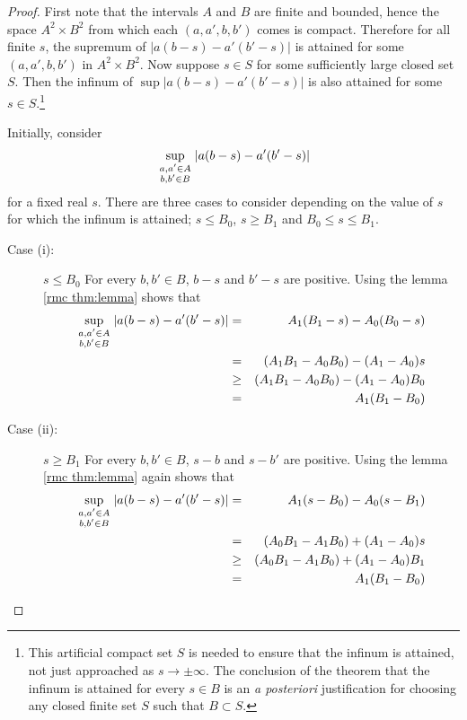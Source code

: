 \begin{proof}
First note that the intervals $A$ and $B$ are finite and bounded, hence the
space $A^2\times B^2$ from which each $(a,a',b,b')$ comes is compact.  
Therefore for all finite $s$, the supremum of $\left|a(b-s)-a'(b'-s)\right|$ 
is attained for some $(a,a',b,b')$ in $A^2\times B^2$.  Now suppose $s\in S$
for some sufficiently large closed set $S$.  Then the infinum of 
$\sup\left|a(b-s)-a'(b'-s)\right|$ is also attained for some $s\in
S$.\footnote{This artificial compact set $S$ is needed to ensure that the 
infinum is attained, not just approached as $s\to\pm\infty$.  The conclusion
of the theorem that the infinum is attained for every $s\in B$ is an 
{\em a posteriori\/} justification for choosing any closed finite set $S$
such that $B\subset S$.}

Initially, consider
\begin{equation}
\sup_{\scriptstyle a,a'\in A\atop\scriptstyle b,b'\in B}
\left|a(b-s)-a'(b'-s)\right|
\end{equation}
for a fixed real $s$.  There are three cases to consider depending on the
value of $s$ for which the infinum is attained; $s\leq B_0$, $s\geq B_1$ and
$B_0\leq s\leq B_1$.
\begin{description}
\item[Case (i):] $s\leq B_0$\hfill\mbox{}\linebreak
For every $b,b'\in B$, $b-s$ and $b'-s$ are positive.  Using the lemma
\ref{rmc thm:lemma} shows that
\begin{eqnarray}
\sup_{\scriptstyle a,a'\in A\atop\scriptstyle b,b'\in B}
\left|a(b-s)-a'(b'-s)\right|
&=&A_1(B_1-s)-A_0(B_0-s){\nonumber}\\
&=&(A_1B_1-A_0B_0)-(A_1-A_0)s{\nonumber}\\
&\geq&(A_1B_1-A_0B_0)-(A_1-A_0)B_0{\nonumber}\\
&=&A_1(B_1-B_0)
\end{eqnarray}

\item[Case (ii):] $s\geq B_1$\hfill\mbox{}\linebreak
For every $b,b'\in B$, $s-b$ and $s-b'$ are positive.  Using the lemma
\ref{rmc thm:lemma} again shows that
\begin{eqnarray}
\sup_{\scriptstyle a,a'\in A\atop\scriptstyle b,b'\in B}
\left|a(b-s)-a'(b'-s)\right|
&=&A_1(s-B_0)-A_0(s-B_1){\nonumber}\\
&=&(A_0B_1-A_1B_0)+(A_1-A_0)s{\nonumber}\\
&\geq&(A_0B_1-A_1B_0)+(A_1-A_0)B_1{\nonumber}\\
&=&A_1(B_1-B_0)
\end{eqnarray}


\end{description}
\end{proof}

